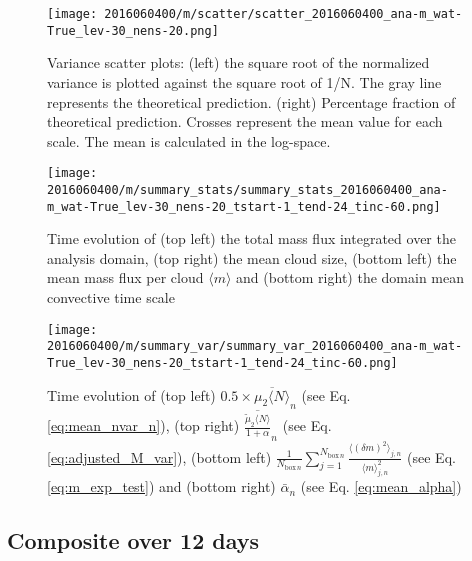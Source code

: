 \documentclass[a4paper, 12pt]{article}
\begin{document}
\begin{figure}[ht] \label{fig:ex_scatter}
\noindent \centering
\texttt{[image: 2016060400/m/scatter/scatter\_2016060400\_ana-m\_wat-True\_lev-30\_nens-20.png]}\\
\caption{Variance scatter plots: (left) the square root of the normalized variance is plotted against the square root of 1/N. The gray line represents the theoretical prediction. (right) Percentage fraction of theoretical prediction. Crosses represent the mean value for each scale. The mean is calculated in the log-space.}
\end{figure}

\begin{figure}[ht] \label{fig:ex_summary_stats}
\noindent \centering
\texttt{[image: 2016060400/m/summary\_stats/summary\_stats\_2016060400\_ana-m\_wat-True\_lev-30\_nens-20\_tstart-1\_tend-24\_tinc-60.png]}\\
\caption{Time evolution of (top left) the total mass flux integrated over the analysis domain, (top right) the mean cloud size, (bottom left) the mean mass flux per cloud $\langle m \rangle$ and (bottom right) the domain mean convective time scale}
\end{figure}

\begin{figure}[ht] \label{fig:ex_summary_var}
\noindent \centering
\texttt{[image: 2016060400/m/summary\_var/summary\_var\_2016060400\_ana-m\_wat-True\_lev-30\_nens-20\_tstart-1\_tend-24\_tinc-60.png]}\\
\caption{Time evolution of (top left) $0.5 \times \overline{\mu_{2}\langle N \rangle}_n$ (see Eq. \ref{eq:mean_nvar_n}), (top right) $\overline{\frac{\tilde{\mu}_2 \langle N \rangle}{1+\alpha}}_n$ (see Eq. \ref{eq:adjusted_M_var}), (bottom left) $\frac{1}{N_{\mathrm{box}\,n}} \sum_{j=1}^{N_{\mathrm{box}\,n}} \frac{\langle (\delta m)^2 \rangle_{j,n}}{\langle m \rangle_{j,n}^2}$ (see Eq. \ref{eq:m_exp_test}) and (bottom right) $\bar{\alpha}_n$ (see Eq. \ref{eq:mean_alpha})}
\end{figure}
\newpage
\clearpage

\subsection{Composite over 12 days}
\end{document}
